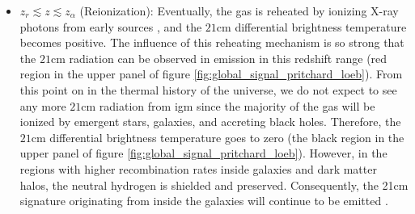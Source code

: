 \documentclass[12pt, TexShade, letterpaper]{report}
\begin{document}
\begin{itemize}
\item $z_r \lesssim z \lesssim z_\alpha$ (Reionization): Eventually, the gas is reheated by ionizing X-ray photons from early sources \cite{21century}, and the $\mathrm{21cm}$ differential brightness temperature becomes positive. The influence of this reheating mechanism is so strong that the $\mathrm{21cm}$ radiation can be observed in emission in this redshift range (red region in the upper panel of figure \ref{fig:global_signal_pritchard_loeb}). From this point on in the thermal history of the universe, we do not expect to see any more $\mathrm{21cm}$ radiation from \gls{igm} since the majority of the gas will be ionized by emergent stars, galaxies, and accreting black holes. Therefore, the $\mathrm{21cm}$ differential brightness temperature goes to zero (the black region in the upper panel of figure \ref{fig:global_signal_pritchard_loeb}). However, in the regions with higher recombination rates inside galaxies and dark matter halos, the neutral hydrogen is shielded and preserved. Consequently, the 21cm signature originating from inside the galaxies will continue to be emitted \cite{map_universe, 21century}.\par
\end{itemize}

\end{document}
